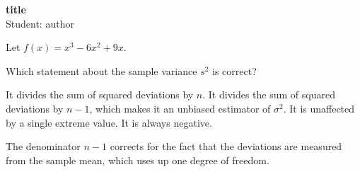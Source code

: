 \documentclass[11pt,addpoints,answers]{exam}
\begin{document}
\begin{center}
  {\Large\bfseries {{title}}}\\[0.6em]
  Student: {{author}}
\end{center}

\vspace{0.5em}

\begin{questions}

  \question[10] Let $f(x) = x^3 - 6x^2 + 9x$.

  \question[5] Which statement about the sample variance $s^2$ is correct?
  \begin{choices}
    \choice It divides the sum of squared deviations by $n$.
    \CorrectChoice It divides the sum of squared deviations by $n-1$, which makes it an unbiased estimator of $\sigma^2$.
    \choice It is unaffected by a single extreme value.
    \choice It is always negative.
  \end{choices}
  \begin{solution}
    The denominator $n-1$ corrects for the fact that the deviations are
    measured from the sample mean, which uses up one degree of freedom.
  \end{solution}


\end{questions}
\end{document}
